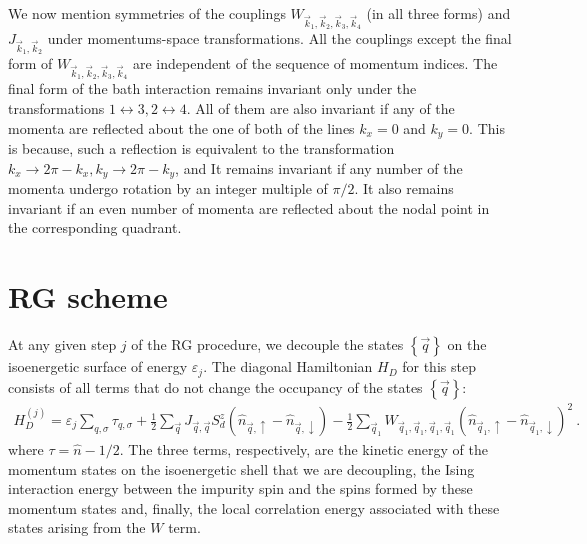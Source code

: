 \documentclass{revtex4-2}
\begin{document}
We now mention symmetries of the couplings \(W_{\vec k_1,\vec k_2,\vec k_3,\vec k_4}\) (in all three forms) and \(J_{\vec k_1, \vec k_2}\) under momentums-space transformations. All the couplings except the final form of \(W_{\vec k_1,\vec k_2,\vec k_3,\vec k_4}\) are independent of the sequence of momentum indices. The final form of the bath interaction remains invariant only under the transformations \(1 \leftrightarrow 3, 2 \leftrightarrow 4\). All of them are also invariant if any of the momenta are reflected about the one of both of the lines \(k_x=0\) and \(k_y=0\). This is because, such a reflection is equivalent to the transformation \(k_x \to 2\pi - k_x, k_y \to 2\pi - k_y\), and It remains invariant if any number of the momenta undergo rotation by an integer multiple of \(\pi/2\). It also remains invariant if an even number of momenta are reflected about the nodal point in the corresponding quadrant.

\section{RG scheme}
At any given step \(j\) of the RG procedure, we decouple the states \(\left\{ \vec q \right\} \) on the isoenergetic surface of energy \(\varepsilon_j\). The diagonal Hamiltonian \(H_D\) for this step consists of all terms that do not change the occupancy of the states \(\left\{\vec q\right\}\):
\begin{equation}\begin{aligned}
	H_D^{(j)} = \varepsilon_j\sum_{q,\sigma}\tau_{q,\sigma} + \frac{1}{2}\sum_{\vec q}J_{\vec q, \vec q}S_d^z\left(\hat n_{\vec q, \uparrow} - \hat n_{\vec q, \downarrow}\right) - \frac{1}{2}\sum_{\vec q_1}W_{\vec q_1, \vec q_1, \vec q_1, \vec q_1}\left(\hat n_{\vec q_1, \uparrow} - \hat n_{\vec q_1, \downarrow}\right)^2~.
\end{aligned}\end{equation}
where \(\tau = \hat n - 1/2\). The three terms, respectively, are the kinetic energy of the momentum states on the isoenergetic shell that we are decoupling, the Ising interaction energy between the impurity spin and the spins formed by these momentum states and, finally, the local correlation energy associated with these states arising from the \(W\) term.
\end{document}
